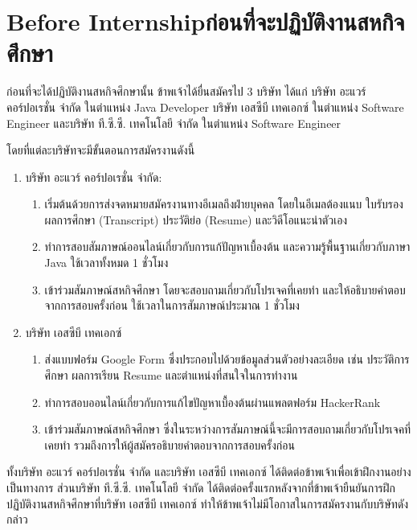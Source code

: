 \section{\ifenglish Before Internship\else ก่อนที่จะปฏิบัติงานสหกิจศึกษา\fi}
ก่อนที่จะได้ปฏิบัติงานสหกิจศึกษานั้น ข้าพเจ้าได้ยื่นสมัครไป 3 บริษัท ได้แก่ บริษัท อะแวร์ คอร์ปอเรชั่น จำกัด ในตำแหน่ง Java Developer บริษัท เอสซีบี เทคเอกซ์ ในตำแหน่ง Software Engineer และบริษัท ที.ซี.ซี. เทคโนโลยี จำกัด ในตำแหน่ง Software Engineer 

โดยที่แต่ละบริษัทจะมีขั้นตอนการสมัครงานดังนี้
\begin{enumerate}
    \item บริษัท อะแวร์ คอร์ปอเรชั่น จำกัด: 
    \begin{enumerate}
        \item เริ่มต้นด้วยการส่งจดหมายสมัครงานทางอีเมลถึงฝ่ายบุคคล โดยในอีเมลต้องแนบ ใบรับรองผลการศึกษา (Transcript) ประวัติย่อ (Resume) และวิดีโอแนะนำตัวเอง
        \item ทำการสอบสัมภาษณ์ออนไลน์เกี่ยวกับการแก้ปัญหาเบื้องต้น และความรู้พื้นฐานเกี่ยวกับภาษา Java ใช้เวลาทั้งหมด 1 ชั่วโมง
        \item เข้าร่วมสัมภาษณ์สหกิจศึกษา โดยจะสอบถามเกี่ยวกับโปรเจคที่เคยทำ และให้อธิบายคำตอบจากการสอบครั้งก่อน ใช้เวลาในการสัมภาษณ์ประมาณ 1 ชั่วโมง
    \end{enumerate}
    \item บริษัท เอสซีบี เทคเอกซ์
    \begin{enumerate}
        \item ส่งแบบฟอร์ม Google Form ซึ่งประกอบไปด้วยข้อมูลส่วนตัวอย่างละเอียด เช่น ประวัติการศึกษา ผลการเรียน Resume และตำแหน่งที่สนใจในการทำงาน
        \item ทำการสอบออนไลน์เกี่ยวกับการแก้ไขปัญหาเบื้องต้นผ่านแพลตฟอร์ม HackerRank
        \item เข้าร่วมสัมภาษณ์สหกิจศึกษา ซึ่งในระหว่างการสัมภาษณ์นี้จะมีการสอบถามเกี่ยวกับโปรเจคที่เคยทำ รวมถึงการให้ผู้สมัครอธิบายคำตอบจากการสอบครั้งก่อน
    \end{enumerate}
\end{enumerate}
ทั้งบริษัท อะแวร์ คอร์ปอเรชั่น จำกัด และบริษัท เอสซีบี เทคเอกซ์ ได้ติดต่อข้าพเจ้าเพื่อเข้าฝึกงานอย่างเป็นทางการ ส่วนบริษัท ที.ซี.ซี. เทคโนโลยี จำกัด ได้ติดต่อครั้งแรกหลังจากที่ข้าพเจ้ายืนยันการฝึกปฏิบัติงานสหกิจศึกษาที่บริษัท เอสซีบี เทคเอกซ์ ทำให้ข้าพเจ้าไม่มีโอกาสในการสมัครงานกับบริษัทดังกล่าว
